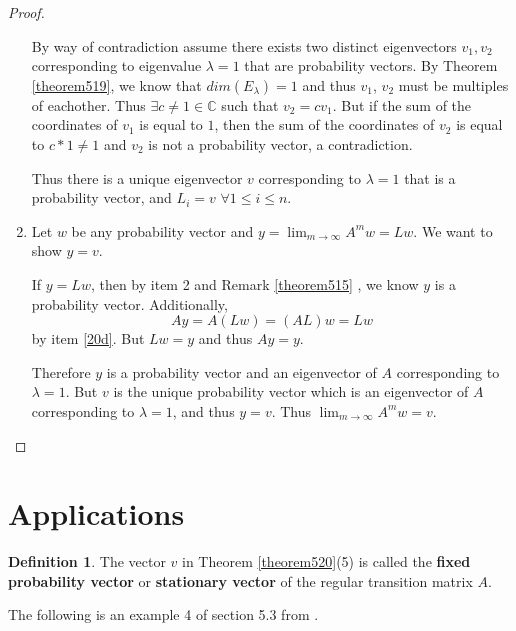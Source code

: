 \documentclass{amsart}
\theoremstyle{definition}
\newtheorem{definition}[thm]{Definition}
\theoremstyle{remark}
\numberwithin{equation}{section}
\begin{document}
\begin{proof}
\begin{enumerate}
            By way of contradiction assume there exists two distinct eigenvectors $v_1, v_2$ corresponding to eigenvalue $\lambda = 1$ that are probability vectors.
            By Theorem \ref{theorem519}, we know that $dim(E_{\lambda}) =1$ and thus $v_1$, $v_2$ must be multiples of eachother.
            Thus $\exists c \neq 1 \in \mathbb{C}$ such that $v_2 = cv_1$.
            But if the sum of the coordinates of $v_1$ is equal to $1$, then the sum of the coordinates of
            $v_2$ is equal to $c* 1 \neq 1$ and $v_2$ is not a probability vector, a contradiction.

            Thus there is a unique eigenvector $v$ corresponding to $\lambda = 1$ that is a probability vector, and $L_i =
            v$  $\forall 1 \leq i \leq n$.

    \item \label{20f}
        Let $w$ be any probability vector and $y = \lim_{m \to \infty} A^m w  = Lw$.
        We want to show $y = v$.

        If $y = Lw$, then by item 2 and Remark \ref{theorem515} , we know $y$ is a probability vector.
        Additionally,
        $$Ay = A(Lw) = (AL)w = Lw$$
        by item \ref{20d}.
        But $Lw = y$ and thus $Ay = y$.

        Therefore $y$ is a probability vector and an eigenvector of $A$ corresponding to $\lambda =
        1$.
        But $v$ is the unique probability vector which is an eigenvector of $A$ corresponding to $\lambda = 1$, and thus $y = v$.
        Thus $\lim_{m \to \infty} A^m w = v$.


\end{enumerate}


\end{proof}

\section{Applications}

\begin{definition}
The vector $v$ in Theorem \ref{theorem520}(5) is called the \textbf{fixed probability vector} or \textbf{stationary vector} of the regular transition matrix $A$.

\end{definition}

The following is an example 4 of section 5.3 from \cite{friedberg2003linear}.
\end{document}
